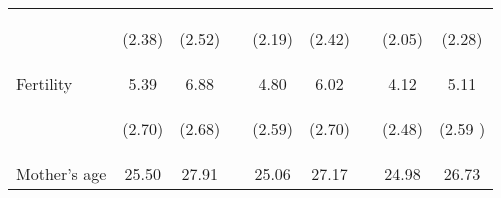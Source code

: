 \documentclass{article}[11pt,subeqn]
\begin{document}
\begin{spacing}{1.5}
\begin{table}[ht]
\begin{center}
\begin{tabular}{lccp{5mm}ccp{5mm}cc}
\begin{footnotesize}\end{footnotesize}	& \begin{footnotesize} (2.38)\end{footnotesize} & \begin{footnotesize} (2.52)\end{footnotesize} & \begin{footnotesize} 	\end{footnotesize} & \begin{footnotesize} (2.19)\end{footnotesize} & \begin{footnotesize} (2.42)\end{footnotesize} & \begin{footnotesize} 	\end{footnotesize} & \begin{footnotesize} (2.05)\end{footnotesize} & \begin{footnotesize} (2.28)\end{footnotesize}	\\
Fertility	&	5.39	&	6.88	&	&	4.80	&	6.02	&	&	4.12	&	5.11		\\
\begin{footnotesize}\end{footnotesize}	& \begin{footnotesize} (2.70)\end{footnotesize} & \begin{footnotesize} (2.68)\end{footnotesize} & \begin{footnotesize} 	\end{footnotesize} & \begin{footnotesize} (2.59)\end{footnotesize} & \begin{footnotesize} (2.70)\end{footnotesize} & \begin{footnotesize} 	\end{footnotesize} & \begin{footnotesize} (2.48)\end{footnotesize} & \begin{footnotesize} (2.59	)\end{footnotesize}	\\
Mother's age	&	25.50	&	27.91	&	&	25.06	&	27.17	&	&	24.98	&	26.73		\\

\end{tabular}
\end{center}
\end{table}
\end{spacing}
\end{document}

